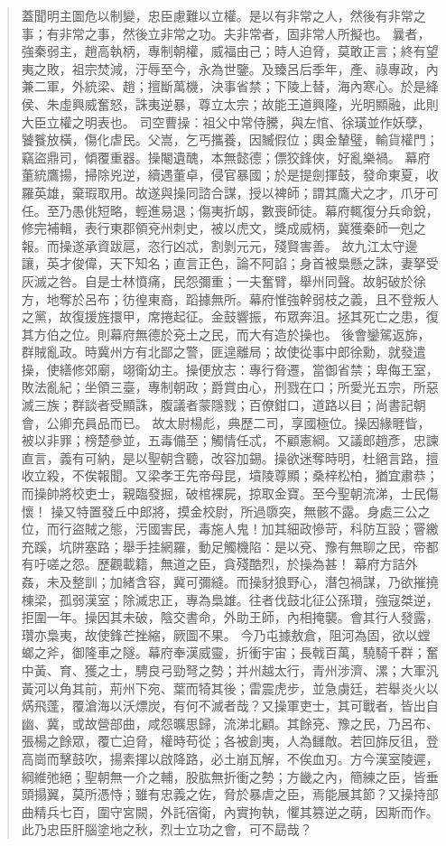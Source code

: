 \begin{quote}
蓋聞明主圖危以制變，忠臣慮難以立權。是以有非常之人，然後有非常之事；有非常之事，然後立非常之功。夫非常者，固非常人所擬也。
曩者，強秦弱主，趙高執柄，專制朝權，威福由己；時人迫脅，莫敢正言；終有望夷之敗，祖宗焚減，汙辱至今，永為世鑒。及臻呂后季年，產、祿專政，內兼二軍，外統梁、趙；擅斷萬機，決事省禁；下陵上替，海內寒心。於是絳侯、朱虛興威奮怒，誅夷逆暴，尊立太宗；故能王道興隆，光明顯融，此則大臣立權之明表也。
司空曹操：祖父中常侍騰，與左悺、徐璜並作妖孽，饕餮放橫，傷化虐民。父嵩，乞丐攜養，因贓假位；輿金輦璧，輸貨權門；竊盜鼎司，傾覆重器。操閹遺醜，本無懿德；僄狡鋒俠，好亂樂禍。
幕府董統鷹揚，掃除兇逆，續遇董卓，侵官暴國；於是提劍揮鼓，發命東夏，收羅英雄，棄瑕取用。故遂與操同諮合謀，授以裨師；謂其鷹犬之才，爪牙可任。至乃愚佻短略，輕進易退；傷夷折衂，數喪師徒。幕府輒復分兵命銳，修完補輯，表行東郡領兗州刺史，被以虎文，獎成威柄，冀獲秦師一剋之報。而操遂承資跋扈，恣行凶忒，割剝元元，殘賢害善。
故九江太守邊讓，英才俊偉，天下知名；直言正色，論不阿諂；身首被梟懸之誅，妻拏受灰滅之咎。自是士林憤痛，民怨彌重；一夫奮臂，舉州同聲。故躬破於徐方，地奪於呂布；彷徨東裔，蹈據無所。幕府惟強幹弱枝之義，且不登叛人之黨，故復援旌擐甲，席捲起征。金鼓響振，布眾奔沮。拯其死亡之患，復其方伯之位。則幕府無德於兗土之民，而大有造於操也。
後會鑾駕返旆，群賊亂政。時冀州方有北鄙之警，匪遑離局；故使從事中郎徐勳，就發遣操，使繕修郊廟，翊衛幼主。操便放志：專行脅遷，當御省禁；卑侮王室，敗法亂紀；坐領三臺，專制朝政；爵賞由心，刑戮在口；所愛光五宗，所惡滅三族；群談者受顯誅，腹議者蒙隱戮；百僚鉗口，道路以目；尚書記朝會，公卿充員品而已。
故太尉楊彪，典歷二司，享國極位。操因緣睚眥，被以非罪；榜楚參並，五毒備至；觸情任忒，不顧憲綱。又議郎趙彥，忠諫直言，義有可納，是以聖朝含聽，改容加錫。操欲迷奪時明，杜絕言路，擅收立殺，不俟報聞。又梁孝王先帝母昆，墳陵尊顯；桑梓松柏，猶宜肅恭；而操帥將校吏士，親臨發掘，破棺裸屍，掠取金寶。至今聖朝流涕，士民傷懷！
操又特置發丘中郎將，摸金校尉，所過隳突，無骸不露。身處三公之位，而行盜賊之態，污國害民，毒施人鬼！加其細政慘苛，科防互設；罾繳充蹊，坑阱塞路；舉手挂網羅，動足觸機陷：是以兗、豫有無聊之民，帝都有吁嗟之怨。歷觀載籍，無道之臣，貪殘酷烈，於操為甚！
幕府方詰外姦，未及整訓；加緒含容，冀可彌縫。而操豺狼野心，潛包禍謀，乃欲摧撓棟梁，孤弱漢室；除滅忠正，專為梟雄。往者伐鼓北征公孫瓚，強寇桀逆，拒圍一年。操因其未破，陰交書命，外助王師，內相掩襲。會其行人發露，瓚亦梟夷，故使鋒芒挫縮，厥圖不果。
今乃屯據敖倉，阻河為固，欲以螳螂之斧，御隆車之隧。幕府奉漢威靈，折衝宇宙；長戟百萬，驍騎千群；奮中黃、育、獲之士，騁良弓勁弩之勢；并州越太行，青州涉濟、漯；大軍汎黃河以角其前，荊州下宛、葉而犄其後；雷震虎步，並急虜廷，若舉炎火以焫飛蓬，覆滄海以沃熛炭，有何不滅者哉？又操軍吏士，其可戰者，皆出自幽、冀，或故營部曲，咸怨曠思歸，流涕北顧。其餘兗、豫之民，乃呂布、張楊之餘眾，覆亡迫脅，權時苟從；各被創夷，人為讎敵。若回旆反徂，登高崗而擊鼓吹，揚素揮以啟降路，必土崩瓦解，不俟血刃。方今漢室陵遲，綱維弛絕；聖朝無一介之輔，股肱無折衝之勢；方畿之內，簡練之臣，皆垂頭搨翼，莫所憑恃；雖有忠義之佐，脅於暴虐之臣，焉能展其節？又操持部曲精兵七百，圍守宮闕，外託宿衛，內實拘執，懼其篡逆之萌，因斯而作。此乃忠臣肝腦塗地之秋，烈士立功之會，可不勗哉？

\end{quote}
